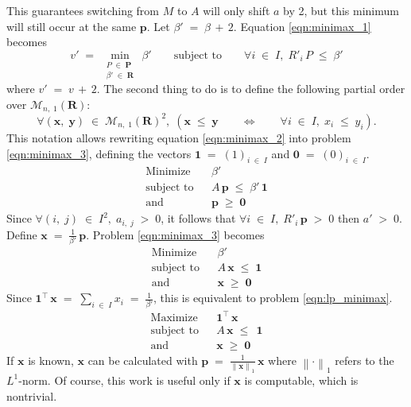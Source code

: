 \documentclass{report}
\theoremstyle{definition}
\theoremstyle{plain}
\begin{document}
This guarantees switching from $M$ to $A$ will only shift $a$ by 2, but this
minimum will still occur at the same $\mathbf p$. Let $\beta'\;=\;\beta\,+\,2$.
Equation \ref{eqn:minimax_1} becomes
\begin{equation}
	v'\;=\;\min_{\substack{P\;\in\;\mathbf P\\\beta'\;\in\;\mathbf R}}\,\beta'
		\qquad\text{subject to}\qquad
		\forall i\;\in\;I,\;R'_i\,P\;\leqslant\;\beta'
	\label{eqn:minimax_2}
\end{equation}
where $v'\;=\;v\,+\,2$. The second thing to do is to define the following
partial order over $\mathscr M_{n,\;1}\left(\mathbf R\right)$:
\[
	\forall\left(\mathbf x,\;\mathbf y\right)
		\;\in\;\mathscr M_{n,\;1}\left(\mathbf R\right)^2,\;\left(
		\mathbf x\;\leqslant\;\mathbf y
		\qquad\Leftrightarrow\qquad
		\forall i\;\in\;I,\;x_i\;\leqslant\;y_i
	\right).
\]
This notation allows rewriting equation \ref{eqn:minimax_2} into problem
\ref{eqn:minimax_3}, defining the vectors
$\mathbf 1\;=\;\left(1\right)_{i\;\in\;I}$ and
$\mathbf 0\;=\;\left(0\right)_{i\;\in\;I}$.
\begin{equation}
	\begin{array}{lll}
		\text{Minimize} & & \beta' \\
		\text{subject to} & &
			A\,\mathbf p\;\leqslant\;\beta'\,\mathbf 1 \\
		\text{and} & & \mathbf p\;\geqslant\;\mathbf 0
	\end{array}
	\label{eqn:minimax_3}
\end{equation}
Since $\forall\left(i,\;j\right)\;\in\;I^2,\;a_{i,\;j}\;>\;0$, it follows that
$\forall i\;\in\;I,\;R'_i\,\mathbf p\;>\;0$ then $a'\;>\;0$. Define
$\mathbf x\;=\;\frac1{\beta'}\,\mathbf p$. Problem \ref{eqn:minimax_3} becomes
\[
	\begin{array}{lll}
		\text{Minimize} & & \beta' \\
		\text{subject to} & & A\,\mathbf x\;\leqslant\;\mathbf 1 \\
		\text{and} & & \mathbf x\;\geqslant\;\mathbf 0
	\end{array}
\]
Since $\mathbf 1^\top\,\mathbf x\;=\;\sum_{i\;\in\;I}x_i\;=\;\frac1{\beta'}$,
this is equivalent to problem \ref{eqn:lp_minimax}.
\begin{equation}
	\begin{array}{lll}
		\text{Maximize} & & \mathbf 1^\top\,\mathbf x \\
		\text{subject to} & & A\,\mathbf x\;\leqslant\;\,\mathbf 1 \\
		\text{and} & & \mathbf x\;\geqslant\;\mathbf 0
	\end{array}
	\label{eqn:lp_minimax}
\end{equation}
If $\mathbf x$ is known, $\mathbf x$ can be calculated with
$\mathbf p\;=\;\frac1{\left\|\mathbf x\right\|_1}\,\mathbf x$ where
$\left\|\cdot\right\|_1$ refers to the $L^1$-norm. Of course, this work is
useful only if $\mathbf x$ is computable, which is nontrivial.
\end{document}
